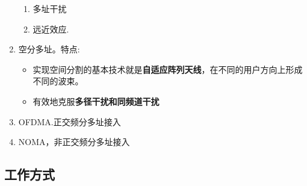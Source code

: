 \begin{enumerate}
		\begin{enumerate}
			\item  多址干扰
			\item  远近效应.
		\end{enumerate}
		\item 空分多址。特点:
		\begin{itemize}
			\item 实现空间分割的基本技术就是\textbf{自适应阵列天线}，在不同的用户方向上形成不同的波束。
			\item 有效地克服\textbf{多径干扰和同频道干扰}
		\end{itemize}
		\item OFDMA.正交频分多址接入
		\item NOMA，非正交频分多址接入
	\end{enumerate}
	\subsection{工作方式}
